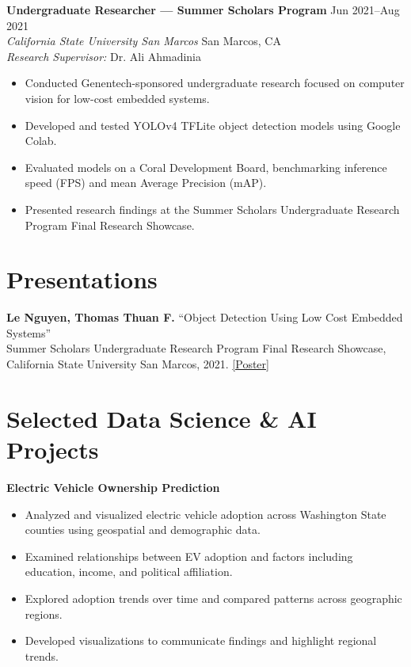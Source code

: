 \documentclass[11pt]{article}
\begin{document}

\vspace{0.4em}

\noindent
    \textbf{Undergraduate Researcher --- Summer Scholars Program} \hfill Jun 2021--Aug 2021\\
    \textit{California State University San Marcos} \hfill San Marcos, CA\\
    \textit{Research Supervisor:} Dr. Ali Ahmadinia
    \begin{itemize}
        \item Conducted Genentech-sponsored undergraduate research focused on computer vision for low-cost embedded systems.
        \item Developed and tested YOLOv4 TFLite object detection models using Google Colab.
        \item Evaluated models on a Coral Development Board, benchmarking inference speed (FPS) and mean Average Precision (mAP).
        \item Presented research findings at the Summer Scholars Undergraduate Research Program Final Research Showcase.
    \end{itemize}


\section{Presentations}

\noindent
    \textbf{Le Nguyen, Thomas Thuan F.} ``Object Detection Using Low Cost Embedded Systems''\\
    Summer Scholars Undergraduate Research Program Final Research Showcase,
    California State University San Marcos, 2021.
    \href{https://thomasthuanlenguyen.me/files/summer-scholars-poster.pdf}{[Poster]}


\section{Selected Data Science \& AI Projects}

\noindent
    \textbf{Electric Vehicle Ownership Prediction}
    \begin{itemize}
        \item Analyzed and visualized electric vehicle adoption across Washington State counties using geospatial and demographic data.
        \item Examined relationships between EV adoption and factors including education, income, and political affiliation.
        \item Explored adoption trends over time and compared patterns across geographic regions.
        \item Developed visualizations to communicate findings and highlight regional trends.
    \end{itemize}
\end{document}
